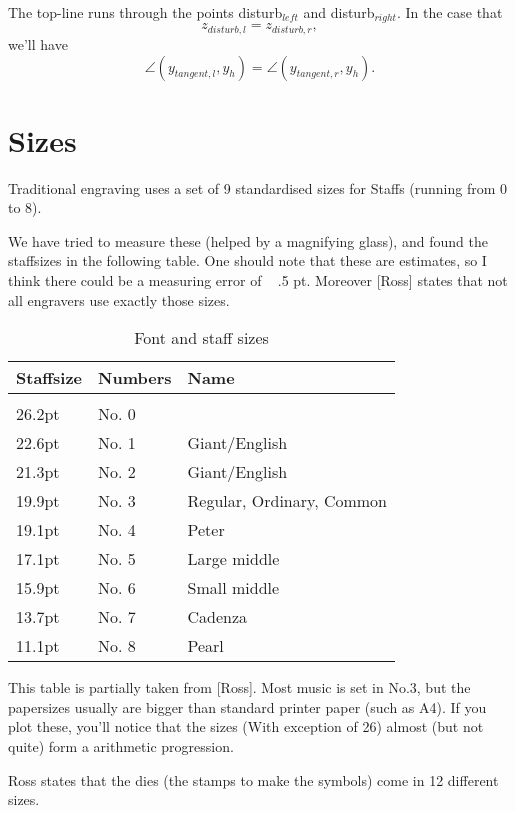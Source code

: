 \documentclass{article}
\begin{document}
The top-line runs through the points disturb$_{left}$ and
disturb$_{right}$.  In the case that 
$$
z_{disturb,l} = z_{disturb,r},
$$
we'll have 
$$
  \angle(y_{tangent,l},y_h) = \angle(y_{tangent,r},y_h).
$$



\section{Sizes}

Traditional engraving uses a set of 9 standardised sizes for Staffs
(running from 0 to 8).  

We have tried to measure these (helped by a magnifying glass), and
found the staffsizes in the following table.  One should note that
these are estimates, so I think there could be a measuring error of ~
.5 pt.  Moreover [Ross] states that not all engravers use exactly
those sizes.

\begin{table}
\begin{tabular}{lll}
Staffsize	&Numbers		&Name\\
\hline\\
26.2pt	&No. 0\\
22.6pt	&No. 1		&Giant/English\\
21.3pt	&No. 2		&Giant/English\\
19.9pt	&No. 3		&Regular, Ordinary, Common\\
19.1pt	&No. 4		&Peter\\
17.1pt	&No. 5		&Large middle\\
15.9pt	&No. 6		&Small middle\\
13.7pt	&No. 7		&Cadenza\\
11.1pt	&No. 8		&Pearl\\
\end{tabular}
\caption{Font and staff sizes}
\end{table}


This table is partially taken from [Ross].  Most music is set in No.3,
but the papersizes usually are bigger than standard printer paper
(such as A4).  If you plot these, you'll notice that the sizes (With
exception of 26) almost (but not quite) form a arithmetic progression.

Ross states that the dies (the stamps to make the symbols) come in
12 different sizes.



\end{document}
